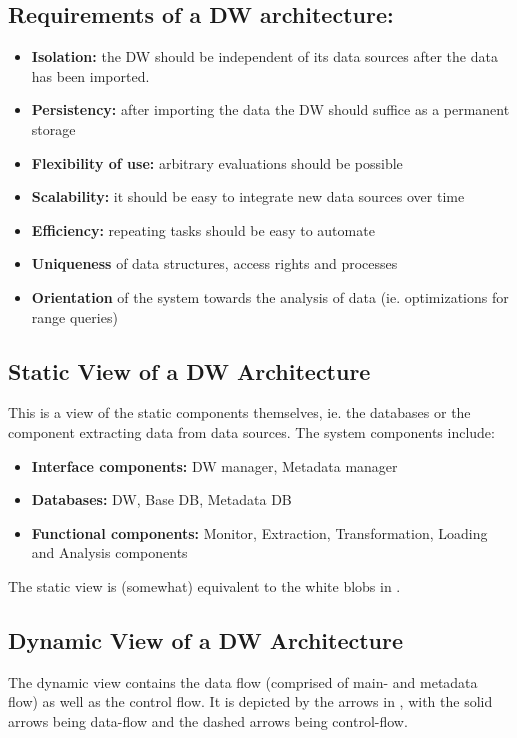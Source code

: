 \documentclass{article}
\begin{document}
\subsection{Requirements of a DW architecture:}
\begin{itemize}
    \item \textbf{Isolation:} the DW should be independent of its data sources after the data has been imported.
    \item \textbf{Persistency:} after importing the data the DW should suffice as a permanent storage
    \item \textbf{Flexibility of use:} arbitrary evaluations should be possible
    \item \textbf{Scalability:} it should be easy to integrate new data sources over time
    \item \textbf{Efficiency:} repeating tasks should be easy to automate
    \item \textbf{Uniqueness} of data structures, access rights and processes
    \item \textbf{Orientation} of the system towards the analysis of data (ie. optimizations for range queries)
\end{itemize}

\subsection{Static View of a DW Architecture}
This is a view of the static components themselves, ie. the databases or the component extracting data from data sources.
The system components include:
\begin{itemize}
    \item \textbf{Interface components:} DW manager, Metadata manager
    \item \textbf{Databases:} DW, Base DB, Metadata DB
    \item \textbf{Functional components:} Monitor, Extraction, Transformation, Loading and Analysis components
\end{itemize}

The static view is (somewhat) equivalent to the white blobs in .

\subsection{Dynamic View of a DW Architecture}
The dynamic view contains the data flow (comprised of main- and metadata flow) as well as the control flow.
It is depicted by the arrows in , with the solid arrows being data-flow and the dashed arrows being control-flow.
\end{document}
